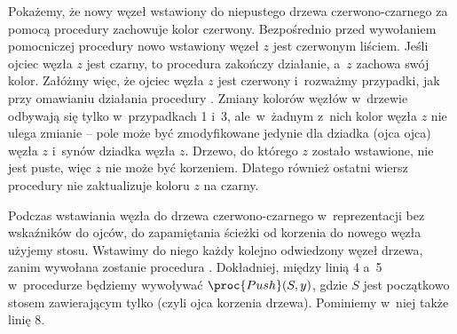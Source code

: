 \exercise %
Pokażemy, że nowy węzeł wstawiony do niepustego drzewa czerwono-czarnego za pomocą procedury  zachowuje kolor czerwony.
Bezpośrednio przed wywołaniem pomocniczej procedury  nowo wstawiony węzeł $z$ jest czerwonym liściem.
Jeśli ojciec węzła $z$ jest czarny, to procedura zakończy działanie, a~$z$ zachowa swój kolor.
Załóżmy więc, że ojciec węzła $z$ jest czerwony i~rozważmy przypadki, jak przy omawianiu działania procedury .
Zmiany kolorów węzłów w~drzewie odbywają się tylko w~przypadkach 1 i~3, ale~w~żadnym z~nich kolor węzła $z$ nie ulega zmianie -- pole  może być zmodyfikowane jedynie dla dziadka (ojca ojca) węzła $z$ i~synów dziadka węzła $z$.
Drzewo, do którego $z$ zostało wstawione, nie jest puste, więc $z$ nie może być korzeniem.
Dlatego również ostatni wiersz procedury  nie zaktualizuje koloru $z$ na czarny.

\exercise %
Podczas wstawiania węzła do drzewa czerwono-czarnego w~reprezentacji bez wskaźników do ojców, do zapamiętania ścieżki od korzenia do nowego węzła użyjemy stosu.
Wstawimy do niego każdy kolejno odwiedzony węzeł drzewa, zanim wywołana zostanie procedura .
Dokładniej, między linią 4 a~5 w~procedurze  będziemy wywoływać $\proc{Push}(S,y)$, gdzie $S$ jest początkowo stosem zawierającym tylko  (czyli ojca korzenia drzewa).
Pominiemy w~niej także linię 8.

